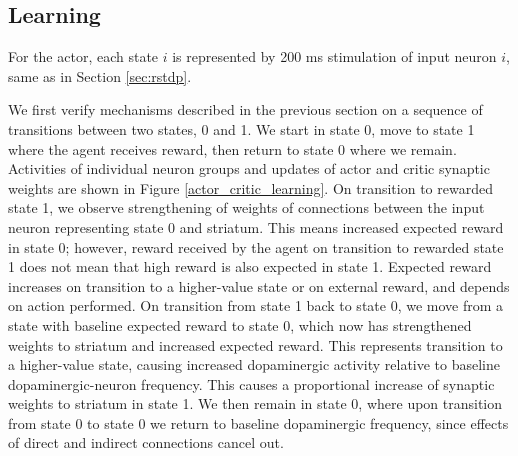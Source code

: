 \documentclass[a4paper,12pt,openright]{book}
\begin{document}
\subsection{Learning}
For the actor, each state $i$ is represented by 200 ms stimulation of input neuron $i$, same as in Section \ref{sec:rstdp}. 

We first verify mechanisms described in the previous section on a sequence of transitions between two states, 0 and 1. We start in state 0, move to state 1 where the agent receives reward, then return to state 0 where we remain. Activities of individual neuron groups and updates of actor and critic synaptic weights are shown in Figure \ref{actor_critic_learning}. On transition to rewarded state 1, we observe strengthening of weights of connections between the input neuron representing state 0 and striatum. This means increased expected reward in state 0; however, reward received by the agent on transition to rewarded state 1 does not mean that high reward is also expected in state 1. Expected reward increases on transition to a higher-value state or on external reward, and depends on action performed. On transition from state 1 back to state 0, we move from a state with baseline expected reward to state 0, which now has strengthened weights to striatum and increased expected reward. This represents transition to a higher-value state, causing increased dopaminergic activity relative to baseline dopaminergic-neuron frequency. This causes a proportional increase of synaptic weights to striatum in state 1. We then remain in state 0, where upon transition from state 0 to state 0 we return to baseline dopaminergic frequency, since effects of direct and indirect connections cancel out.
\end{document}
